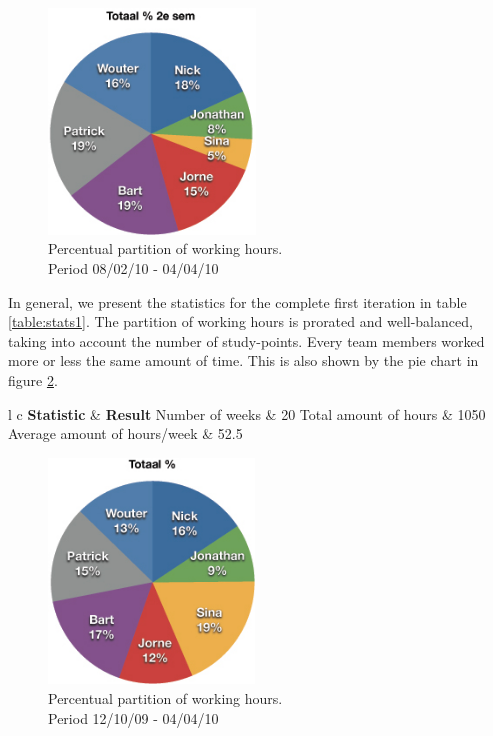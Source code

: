 \documentclass[salesmen, twoside]{../../../templates/latex/2009/softproj}
\begin{document}
\begin{projdoc}
			\begin{figure}
				\begin{center}
				\includegraphics[height=6cm]{../../img/partition-1iter-2.jpg}
				\caption{Percentual partition of working hours. \\ Period 08/02/10 - 04/04/10}
				\label{fig:stats1-2}
				\end{center}
			\end{figure}
			
			In general, we present the statistics for the complete first iteration in table \ref{table:stats1}. The 
			partition of working hours is prorated and well-balanced, taking into account the number of study-points. Every 
			team members worked more or less the same amount of time. This is 
			also shown by the pie chart
			in figure \ref{fig:stats1-3}.
			 
			\begin{table}
				\begin{center}
			\begin{tabular}{l c}
				\FL \textbf{Statistic} & \textbf{Result}
				\ML Number of weeks & 20
				\NN Total amount of hours  & 1050
				\NN Average amount of hours/week & 52.5
			\end{tabular}
			\end{center}
			\caption{General statistics for period 12/10/09 - 04/04/10.}
			\label{table:stats1}
			\end{table}
			
			\begin{figure}
				\begin{center}
				\includegraphics[height=6cm]{../../img/partition-1iter-3.jpg}
				\caption{Percentual partition of working hours. \\ Period 12/10/09 - 04/04/10}
				\label{fig:stats1-3}
				\end{center}
			\end{figure}
						

\end{projdoc}
\end{document}
